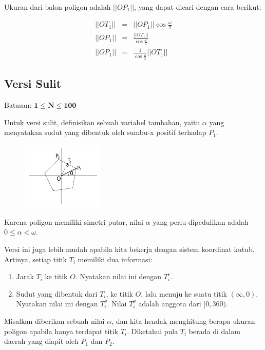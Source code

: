 \documentclass[../main_editorial.tex]{subfiles} %
\begin{document}
Ukuran dari balon poligon adalah $||OP_1||$, yang dapat dicari dengan cara berikut:

\begin{eqnarray*}
||OT_1|| &=& ||OP_1|| \cos{\frac{\omega}{2}} \\
||OP_1|| &=& \frac{||OT_1||}{\cos{\frac{\omega}{2}}} \\
||OP_1|| &=& \frac{1}{\cos{\frac{\omega}{2}}} ||OT_1||
\end{eqnarray*}

\subsection*{Versi Sulit}

Batasan: $\mathbf{1 \le N \le 100}$

Untuk versi sulit, definisikan sebuah variabel tambahan, yaitu $\alpha$ yang menyatakan sudut yang dibentuk oleh sumbu-x positif terhadap $P_1$.

\begin{figure}[!h]
	\centering
	\includegraphics[width=0.35\textwidth]{balon/asset/hard-intro.pdf}
\end{figure}

Karena poligon memiliki simetri putar, nilai $\alpha$ yang perlu dipedulikan adalah $0 \le \alpha < \omega$. 

Versi ini juga lebih mudah apabila kita bekerja dengan sistem koordinat kutub. Artinya, setiap titik $T_i$ memiliki dua informasi:

\begin{enumerate}
  \item Jarak $T_i$ ke titik $O$. Nyatakan nilai ini dengan $T_i^r$.
  \item Sudut yang dibentuk dari $T_i$, ke titik $O$, lalu menuju ke suatu titik $(\infty, 0)$. Nyatakan nilai ini dengan $T_i^\theta$. Nilai $T_i^\theta$ adalah anggota dari $[0, 360)$.
\end{enumerate}

Misalkan diberikan sebuah nilai $\alpha$, dan kita hendak menghitung berapa ukuran poligon apabila hanya terdapat titik $T_i$. Diketahui pula $T_i$ berada di dalam daerah yang diapit oleh $P_1$ dan $P_2$. 
\end{document}
